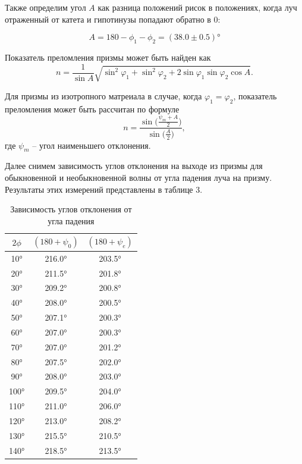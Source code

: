 \documentclass[a4paper]{article}
\begin{document}
Также определим угол $A$ как разница положений рисок в положениях, когда луч отраженный от катета и гипотинузы попадают обратно в 0:

\begin{equation}
    A = 180 - \phi_1 - \phi_2 = (38.0 \pm 0.5)\text{°}
\end{equation}

\noindent Показатель преломления призмы может быть найден как
\begin{equation}
    n = \frac{1}{\sin A} \sqrt{\sin^2\varphi_1 + \sin^2\varphi_2 + 2\sin\varphi_1\sin\varphi_2\cos A}.
\end{equation}

\noindent Для призмы из изотропного матреиала в случае, когда $\varphi_1 = \varphi_2$, показатель преломления может быть рассчитан по формуле
\begin{equation}
    n = \frac{ \sin\big( \frac{\psi_m + A}{2} \big) }{ \sin\big(\frac{A}{2}\big) },
\end{equation}
где $\psi_m$ -- угол наименьшего отклонения.

Далее снимем зависимость углов отклонения на выходе из призмы для обыкновенной и необыкновенной волны от угла падения луча на призму. Результаты этих измерений представлены в таблице 3.

\begin{table}[h!]
\centering
\begin{tabular}{|c|c|c|}
\hline
$2 \phi$ & $(180 + \psi_0)$ & $(180 + \psi_e)$ \\ \hline
10°  & 216.0° & 203.5° \\ \hline
20°  & 211.5° & 201.8° \\ \hline
30°  & 209.2° & 200.8° \\ \hline
40°  & 208.0° & 200.5° \\ \hline
50°  & 207.1° & 200.3° \\ \hline
60°  & 207.0° & 200.3° \\ \hline
70°  & 207.0° & 201.2° \\ \hline
80°  & 207.5° & 202.0° \\ \hline
90°  & 208.0° & 203.0° \\ \hline
100° & 209.5° & 204.0° \\ \hline
110° & 211.0° & 206.0° \\ \hline
120° & 213.0° & 208.2° \\ \hline
130° & 215.5° & 210.5° \\ \hline
140° & 218.5° & 213.5° \\ \hline
\end{tabular}
\caption{Зависимость углов отклонения от угла падения}
\end{table}
\end{document}
